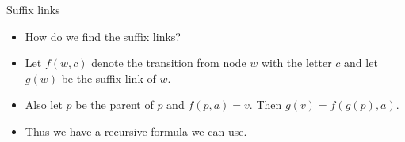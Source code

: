 \documentclass{beamer}
\begin{document}
\begin{frame}[plain]{Suffix links}
	\begin{itemize}
        \item How do we find the suffix links?
        \item Let $f(w, c)$ denote the transition from node $w$ with the letter $c$ and let $g(w)$ be the suffix link of $w$.
        \item Also let $p$ be the parent of $p$ and $f(p, a) = v$. Then $g(v) = f(g(p), a)$.
        \item Thus we have a recursive formula we can use.
    \end{itemize}
\end{frame}
\end{document}

